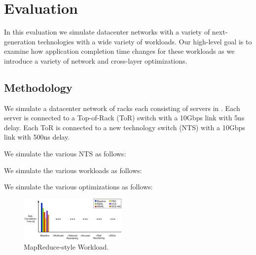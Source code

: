 \newpage\phantom{t}
\section{Evaluation}
\label{sec:eval}


In this evaluation we simulate datacenter networks with a variety of
next-generation technologies with a wide variety of workloads. Our high-level
goal is to examine how application completion time changes for these workloads
as we introduce a variety of network and cross-layer optimizations.


\subsection{Methodology}
\label{sec:methodology}

We simulate a datacenter network of  racks each consisting of
 servers in . Each server is connected to a Top-of-Rack
(ToR) switch with a 10Gbps link with 5ns delay. Each ToR is connected to a new
technology switch (NTS) with a 10Gbps link with 500ns delay.

We simulate the various NTS as follows: 

We simulate the various workloads as follows: 

We simulate the various optimizations as follows: 



\newpage\phantom{t}
\begin{figure}[t!!!]
\centering
\includegraphics[width=0.47\textwidth]{figures/eval/map_red}
\caption{MapReduce-style Workload.}
\label{fig:eval_MR}
\end{figure}

